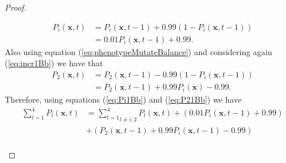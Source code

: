 \documentclass[\main/thesis.tex]{subfiles}
\begin{document}
\begin{proof}
\begin{itemize}
\begin{itemize}
\begin{itemize}
\begin{align*}
                             	                       P_i(\boldsymbol{x}, t) &{=}
                             	                       P_i(\boldsymbol{x}, t{-}1)
                             	                       {+} 0.99 (1 {-} P_i(\boldsymbol{x}, t{-}1))\\
                             	                       &{=} 0.01 P_i(\boldsymbol{x}, t{-} 1) {+} 0.99.
                             	                       \tag{12}
                             	                       \label{eq:Pi1Bb}
                             	                     \end{align*}
                             	                     Also using equation (\ref{eq:phenotypeMutateBalance}) and considering 
                             	                     again (\ref{eq:incr1Bb}) we have that
                             	                     \begin{align*}
                             	                       P_2(\boldsymbol{x}, t) &{=} P_2(\boldsymbol{x}, t{-}1) 
                             	                                               {-} 0.99 (1{-}P_i(\boldsymbol{x}, t{-}1))\\
                             	                                              &{=} P_2(\boldsymbol{x}, t{-}1)
                             	                                               {+} 0.99 P_i(\boldsymbol{x}) {-} 0.99.
                             	                       \tag{13}
                             	                       \label{eq:P21Bb}
                             	                     \end{align*}
                             	                     Therefore, using equations (\ref{eq:Pi1Bb}) and (\ref{eq:P21Bb}) we 
                             	                     have 
                             	                     \begin{align*}
                             	                       \sum_{l{=}1}^4 P_l(\boldsymbol{x}, t) 
                                           	           &{=} \underset{l {\ne} i, 2}{\sum_{l{=}1}^4} P_l(\boldsymbol{x}, t)
                             	                        {+} (0.01 P_i(\boldsymbol{x}, t{-} 1) {+} 0.99)\\
                             	                       &{+} (P_2(\boldsymbol{x}, t{-}1) {+} 0.99 P_i(\boldsymbol{x}, t{-}1)
                             	                        {-} 0.99)
                             	                       \\

\end{align*}
\end{itemize}
\end{itemize}
\end{itemize}
\end{proof}
\end{document}

